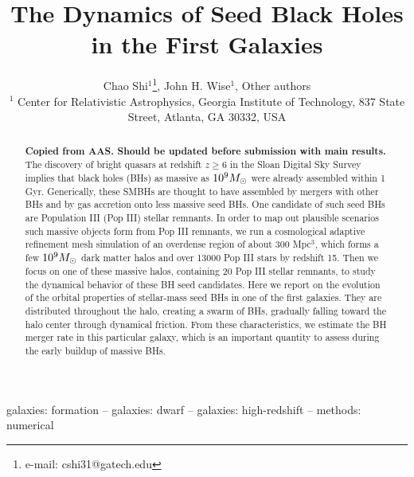\documentclass[useAMS,usenatbib]{mn2e}
\begin{document}
\title[Seed Black Holes in the First Galaxies]{The Dynamics of Seed
  Black Holes in the First Galaxies}

\author[C. Shi et al.]{Chao Shi$^1$\thanks{e-mail:
    cshi31@gatech.edu}, John H. Wise$^1$, Other authors\\
  $^{1}$ Center for Relativistic Astrophysics, Georgia Institute of
  Technology, 837 State Street, Atlanta, GA
  30332, USA\\
}
\pagerange{\pageref{firstpage}--\pageref{lastpage}} 

\maketitle
\label{firstpage}

\begin{abstract}

  \textbf{Copied from AAS.  Should be updated before submission with
    main results.} The discovery of bright quasars at redshift $z \ge
  6$ in the Sloan Digital Sky Survey implies that black holes (BHs) as
  massive as $10^9 \Ms$ were already assembled within 1
  Gyr. Generically, these SMBHs are thought to have assembled by
  mergers with other BHs and by gas accretion onto less massive seed
  BHs. One candidate of such seed BHs are Population III (Pop III)
  stellar remnants. In order to map out plausible scenarios such
  massive objects form from Pop III remnants, we run a cosmological
  adaptive refinement mesh simulation of an overdense region of about
  300 Mpc$^3$, which forms a few $10^9 \Ms$ dark matter halos and over
  13000 Pop III stars by redshift 15. Then we focus on one of these
  massive halos, containing 20 Pop III stellar remnants, to study the
  dynamical behavior of these BH seed candidates. Here we report on
  the evolution of the orbital properties of stellar-mass seed BHs in
  one of the first galaxies. They are distributed throughout the halo,
  creating a swarm of BHs, gradually falling toward the halo center
  through dynamical friction. From these characteristics, we estimate
  the BH merger rate in this particular galaxy, which is an important
  quantity to assess during the early buildup of massive BHs.

\end{abstract}

\begin{keywords}
  galaxies: formation -- galaxies: dwarf -- galaxies: high-redshift --
  methods: numerical
\end{keywords}
\end{document}
